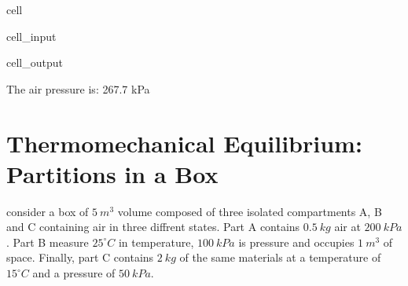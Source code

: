 \documentclass[letterpaper,10pt,english]{jupyterBook}
\begin{document}
\begin{sphinxuseclass}{cell}\begin{sphinxVerbatimInput}

\begin{sphinxuseclass}{cell_input}
\begin{sphinxVerbatim}[commandchars=\\\{\}]
   
         
  
\end{sphinxVerbatim}

\end{sphinxuseclass}\end{sphinxVerbatimInput}
\begin{sphinxVerbatimOutput}

\begin{sphinxuseclass}{cell_output}
\begin{sphinxVerbatim}[commandchars=\\\{\}]
The air pressure is: 267.7 kPa
\end{sphinxVerbatim}

\end{sphinxuseclass}\end{sphinxVerbatimOutput}

\end{sphinxuseclass}
\sphinxstepscope


\section{Thermo\sphinxhyphen{}mechanical Equilibrium: Partitions in a Box}
\label{\detokenize{notebooks/Chapter3/CH3-Q2_v1:thermo-mechanical-equilibrium-partitions-in-a-box}}\label{\detokenize{notebooks/Chapter3/CH3-Q2_v1::doc}}
\sphinxAtStartPar
consider a box of \(5\:m^3\) volume composed of three isolated compartments A, B and C containing air in three diffrent states. Part A contains \(0.5\:kg\) air at \(200\:kPa\). Part B measure \(25 ^{\circ} C\) in temperature, \(100\:kPa\) is pressure and occupies \(1\:m^3\) of space. Finally, part C contains \(2\:kg\) of the same materials at a temperature of \(15 ^{\circ} C\) and a pressure of \(50\:kPa\).
\end{document}
